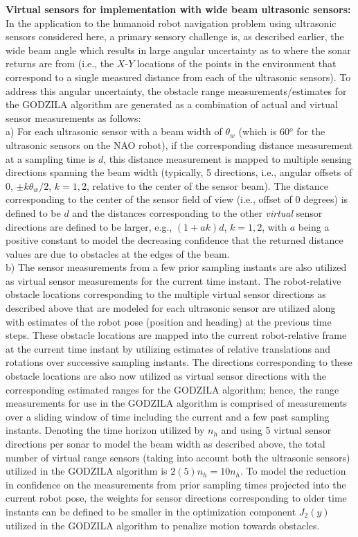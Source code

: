 \documentclass[10pt,conference]{ieeeconf}
\begin{document}
{\bf Virtual sensors for implementation with wide beam ultrasonic sensors:} In the application to the humanoid robot navigation problem using ultrasonic
sensors considered here, a primary sensory challenge is, as described earlier,
the wide beam angle which 
results in large angular uncertainty as to where the sonar returns are from
(i.e., the $X$-$Y$ locations of the points in the environment that correspond to
a single measured distance from each of the ultrasonic sensors). To address
this angular uncertainty, the obstacle range measurements/estimates for the
GODZILA algorithm are generated as a combination of actual and virtual sensor
measurements as follows:\\
a)
    For each ultrasonic sensor with a beam width of $\theta_w$ (which is
    60$^o$ for the ultrasonic sensors on the NAO robot), if the corresponding
    distance measurement at a sampling time is $d$, this distance measurement
    is mapped to multiple sensing directions spanning the beam width
    (typically, 5 directions, i.e., angular offsets of $0$, $\pm k
    \theta_w/2$, $k=1,2$,
    relative to the center of the sensor beam). The distance
    corresponding to the center of the sensor field of view (i.e., offset of
    $0$ degrees) is defined to be $d$ and the distances corresponding to the
    other {\em virtual} sensor directions are defined to be larger, e.g.,
    $(1+ak)d$, $k=1,2$, with $a$ being a positive constant to model the
    decreasing confidence that the returned distance values are due to
    obstacles at the edges of the beam. 
    \\
    b) The sensor measurements from a few prior sampling instants are also
    utilized as virtual sensor measurements for the current time instant. The
    robot-relative obstacle locations corresponding to the multiple virtual sensor directions
    as described above that are modeled for each ultrasonic sensor are
    utilized along with estimates of the robot pose (position and heading)
   at the previous time steps. These obstacle locations are mapped into the
   current robot-relative frame at the current time instant by utilizing
   estimates of relative translations and rotations over successive sampling
   instants. The directions corresponding to these obstacle locations are also
   now utilized as virtual sensor directions with the corresponding estimated
   ranges for the GODZILA algorithm; hence,
    the range measurements for use in the GODZILA algorithm is comprised of
    measurements over
    a sliding window of time including the current and a few past sampling
    instants. Denoting the time horizon utilized by $n_h$ and using 5 virtual sensor
    directions per sonar to model the beam width as described above, the total number of virtual
    range sensors (taking into account both the ultrasonic sensors) utilized
    in the GODZILA algorithm is $2(5)n_h=10n_h$. To model the reduction in
    confidence on the measurements from prior sampling times projected into
    the current robot pose, the weights for sensor directions corresponding to
    older time instants can be defined to be smaller in the optimization
    component $J_2(y)$ utilized in the GODZILA algorithm to penalize motion
    towards obstacles.
\end{document}
